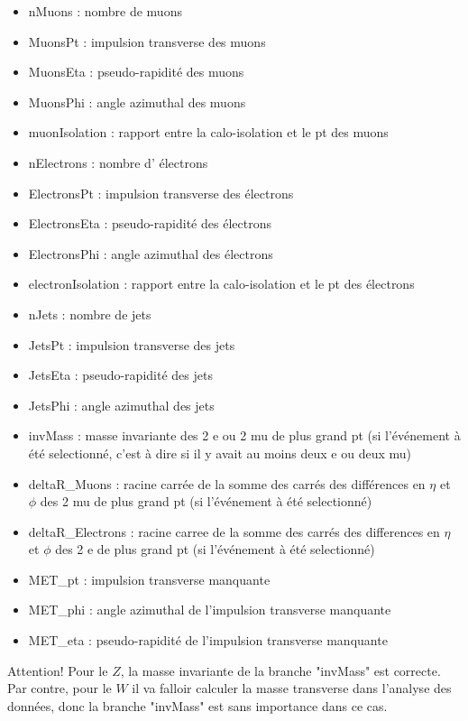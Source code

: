 \documentclass[a4paper]{report}
\begin{document}
\begin{itemize}
 \item nMuons : nombre de muons
 \item MuonsPt : impulsion transverse des muons
 \item MuonsEta : pseudo-rapidit\'{e} des muons
 \item MuonsPhi : angle azimuthal des muons
 \item muonIsolation : rapport entre la calo-isolation et le pt des muons
 \item nElectrons : nombre d' \'{e}lectrons
 \item ElectronsPt : impulsion transverse des \'{e}lectrons
 \item ElectronsEta : pseudo-rapidit\'{e} des \'{e}lectrons
 \item ElectronsPhi : angle azimuthal des \'{e}lectrons
 \item electronIsolation : rapport entre la calo-isolation et le pt des \'{e}lectrons
 \item nJets : nombre de jets
 \item JetsPt : impulsion transverse des jets
 \item JetsEta : pseudo-rapidit\'{e} des jets
 \item JetsPhi : angle azimuthal des jets
 \item invMass : masse invariante des 2 e ou 2 mu de plus grand pt (si l'\'{e}v\'{e}nement \`{a} \'{e}t\'{e} selectionn\'{e}, c'est à dire si il y avait au moins deux e ou deux mu)
 \item deltaR\_Muons : racine carr\'{e}e de la somme des carr\'{e}s des diff\'{e}rences en $\eta$ et $\phi$ des 2 mu de plus grand pt (si l'\'{e}v\'{e}nement \`{a} \'{e}t\'{e} selectionn\'{e})
 \item deltaR\_Electrons : racine carree de la somme des carrés des differences en $\eta$ et $\phi$ des 2 e de plus grand pt (si l'\'{e}v\'{e}nement \`{a} \'{e}t\'{e} selectionn\'{e})
 \item MET\_pt : impulsion transverse manquante
 \item MET\_phi : angle azimuthal de l'impulsion transverse manquante
 \item MET\_eta : pseudo-rapidit\'{e} de l'impulsion transverse manquante
\end{itemize}
\w

Attention! Pour le $Z$, la masse invariante de la branche "invMass" est correcte. Par contre, pour le $W$ il va falloir calculer la masse transverse dans l'analyse des données, donc la branche "invMass" est sans importance dans ce cas. 
\end{document}
